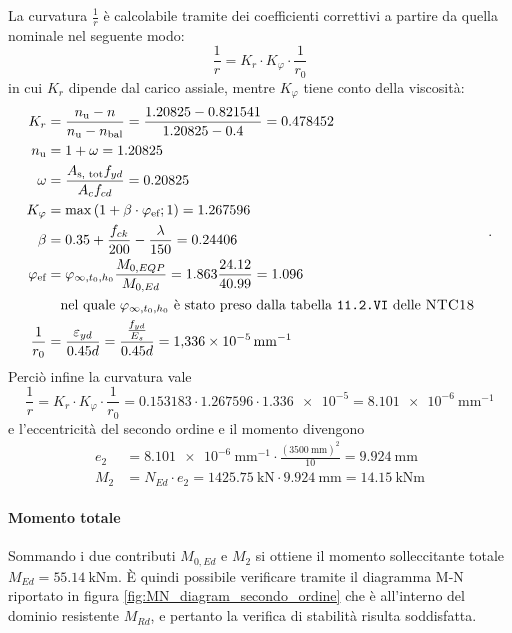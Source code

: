 La curvatura $\frac{1}{r}$ è calcolabile tramite dei coefficienti correttivi a partire da quella nominale nel seguente modo:
\begin{equation}
    \frac{1}{r} = K_r \cdot K_\varphi \cdot \frac{1}{r_0}
\end{equation}
in cui $K_r$ dipende dal carico assiale, mentre $K_\varphi$ tiene conto della viscosità:
\[
\begin{split}
    K_r &= \frac{n_\textup{u} - n}{n_\textup{u} - n_\textup{bal}} = \frac{1.20825 - 0.821541}{1.20825 - 0.4} = 0.478452\\
    n_\textup{u} &= 1 + \omega = 1.20825 \\
    \omega &= \frac{A_\textup{s, tot} f_{yd}}{A_c f_{cd}} = 0.20825 \\
    K_\varphi &= \max \left(1 + \beta \cdot \varphi_\textup{ef}; 1 \right) = 1.267596	 \\
    \beta &= 0.35 + \frac{f_{ck}}{200} - \frac{\lambda}{150} = 0.24406 \\
    \varphi_\textup{ef} &= \varphi_{\infty, t_0, h_0} \frac{M_{0,EQP}}{M_{0,Ed}}= 1.863 \frac{24.12}{40.99} = 1.096 \\
        &\quad \text{nel quale $\varphi_{\infty, t_0, h_0}$ è stato preso dalla tabella \normaref{11.2.VI} delle \norma{NTC18}} \\
    \frac{1}{r_0} &= \frac{\varepsilon_{yd}}{0.45 d} = \frac{\frac{f_{yd}}{E_s}}{0.45 d} = \SI{1.336e-5}{\milli\metre\tothe{-1}}
\end{split}
\quad .
\] 
Perciò infine la curvatura vale 
\[
    \frac{1}{r} = K_r \cdot K_\varphi \cdot \frac{1}{r_0} = 0.153183 \cdot 1.267596	 \cdot \num{1.336e-5} = \SI{8.101e-6}{\milli\metre\tothe{-1}}
\]
e l'eccentricità del secondo ordine e il momento divengono
\begin{equation}
    \begin{split}
        e_2 &=\SI{8.101e-6}{\milli\metre\tothe{-1}} \cdot \frac{(\SI{3500}{\milli\metre})^2}{10} = \SI{9.924}{\milli\metre} \\
        M_2 &=  N_{Ed}\cdot e_2  = \SI{1425.75}{\kilo\newton} \cdot \SI{9.924}{\milli\metre} = \SI{14.15}{\kilo\newton\metre} 
    \end{split}
\end{equation}

\paragraph{Momento totale}
Sommando  i due contributi $M_{0,Ed}$ e $M_2$ si ottiene il momento solleccitante totale  $M_{Ed} = \SI{55.14}{\kilo\newton\metre}$.
È quindi possibile verificare tramite il diagramma M-N riportato in figura \ref{fig:MN_diagram_secondo_ordine} che è all'interno del dominio resistente $M_{Rd}$, e pertanto la verifica di stabilità risulta soddisfatta.

